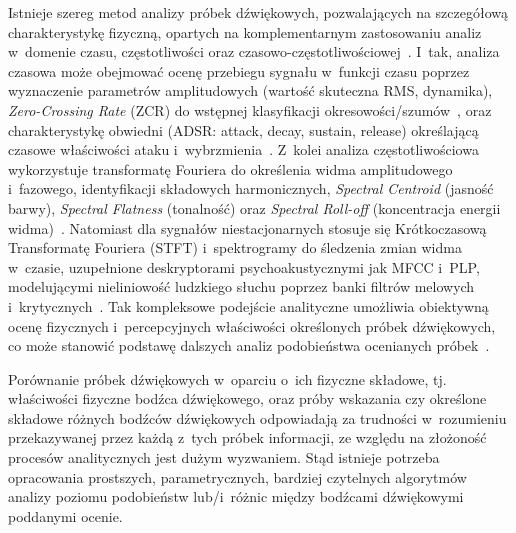 \documentclass{article}
\begin{document}
Istnieje szereg metod analizy próbek dźwiękowych, pozwalających na szczegółową charakterystykę fizyczną, opartych na komplementarnym zastosowaniu analiz w~domenie czasu, częstotliwości oraz czasowo-częstotliwościowej~\cite{Letowski1989SoundQuality,Peeters2004CUIDADO}. I~tak, analiza czasowa może obejmować ocenę przebiegu sygnału w~funkcji czasu poprzez wyznaczenie parametrów amplitudowych (wartość skuteczna RMS, dynamika), \textit{Zero-Crossing Rate} (ZCR) do wstępnej klasyfikacji okresowości/szumów~\cite{Gouyon2000}, oraz charakterystykę obwiedni (ADSR: attack, decay, sustain, release) określającą czasowe właściwości ataku i~wybrzmienia~\cite{Peeters2004CUIDADO}. Z~kolei analiza częstotliwościowa wykorzystuje transformatę Fouriera do określenia widma amplitudowego i~fazowego, identyfikacji składowych harmonicznych, \textit{Spectral Centroid} (jasność barwy), \textit{Spectral Flatness} (tonalność) oraz \textit{Spectral Roll-off} (koncentracja energii widma)~\cite{Peeters2004CUIDADO,saitis2020brightness}. 
Natomiast dla sygnałów niestacjonarnych stosuje się Krótkoczasową Transformatę Fouriera (STFT) i~spektrogramy do śledzenia zmian widma w~czasie, uzupełnione deskryptorami psychoakustycznymi jak MFCC i~PLP, modelującymi nieliniowość ludzkiego słuchu poprzez banki filtrów melowych i~krytycznych~\cite{Hermansky1990,tracey2023interpretable_mfcc}.
Tak kompleksowe podejście analityczne umożliwia obiektywną ocenę fizycznych i~percepcyjnych właściwości określonych próbek dźwiękowych, co może stanowić podstawę dalszych analiz podobieństwa ocenianych próbek~\cite{Peeters2004CUIDADO}.

Porównanie próbek dźwiękowych w~oparciu o~ich fizyczne składowe, tj. właściwości fizyczne bodźca dźwiękowego, oraz próby wskazania czy określone składowe różnych bodźców dźwiękowych odpowiadają za trudności w~rozumieniu przekazywanej przez każdą z~tych próbek informacji, ze względu na złożoność procesów analitycznych jest dużym wyzwaniem. Stąd istnieje potrzeba opracowania prostszych, parametrycznych, bardziej czytelnych algorytmów analizy poziomu podobieństw lub/i~różnic między bodźcami dźwiękowymi poddanymi ocenie.
\end{document}
